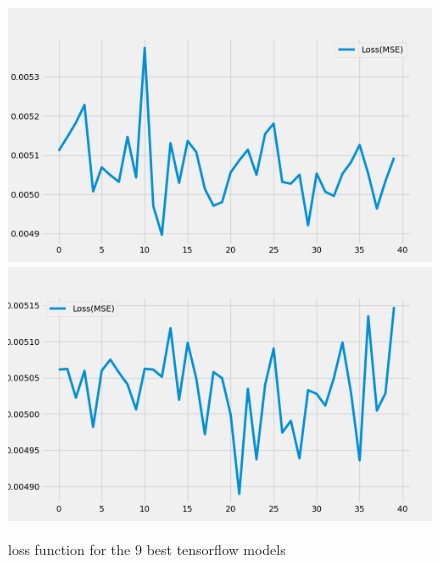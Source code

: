 \begin{figure}[H]
    \includegraphics[width=.30\textwidth]{../data/Figures/Neural networks/ForLoop_Tensor/plotLoss_52.png}\hfill
    \includegraphics[width=.30\textwidth]{../data/Figures/Neural networks/ForLoop_Tensor/plotLoss_268.png}\hfill
    \caption{loss function for the 9 best tensorflow models}\label{fig:tensorflow preds loss}
\end{figure}